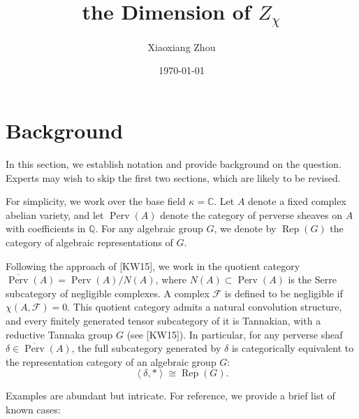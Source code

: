 \documentclass[UTF8]{amsart}
\numberwithin{equation}{section}
\theoremstyle{plain}
\numberwithin{equation}{section}
\theoremstyle{remark}
\DeclareMathOperator{\Rep}{\operatorname{Rep}}
\DeclareMathOperator{\Perv}{\operatorname{Perv}}
\begin{document}
\date{\today}

\title
{the Dimension of $Z_{\chi}$
}
\author{Xiaoxiang Zhou}
\address{Institut für Mathematik\\
Humboldt-Universität zu Berlin\\
Berlin, 12489\\ Germany\\} 


\maketitle
\tableofcontents


\section{Background}
In this section, we establish notation and provide background on the question. Experts may wish to skip the first two sections, which are likely to be revised.

For simplicity, we work over the base field $\kappa = \mathbb{C}$. Let $A$ denote a fixed complex abelian variety, and let $\Perv(A)$ denote the category of perverse sheaves on $A$ with coefficients in $\mathbb{Q}$. For any algebraic group $G$, we denote by $\Rep(G)$ the category of algebraic representations of $G$.

Following the approach of [KW15], we work in the quotient category $\overline{\Perv}(A) = \Perv(A) / N(A)$, where $N(A) \subset \Perv(A)$ is the Serre subcategory of negligible complexes. A complex $\mathcal{F}$ is defined to be negligible if $\chi(A, \mathcal{F}) = 0$. This quotient category admits a natural convolution structure, and every finitely generated tensor subcategory of it is Tannakian, with a reductive Tannaka group $G$ (see [KW15]). In particular, for any perverse sheaf $\delta \in \overline{\Perv}(A)$, the full subcategory generated by $\delta$ is categorically equivalent to the representation category of an algebraic group $G$:
$$\left< \delta, * \right> \cong \Rep(G).$$

Examples are abundant but intricate. For reference, we provide a brief list of known cases:
\end{document}
